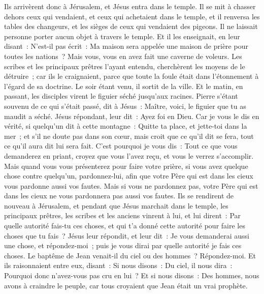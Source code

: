 \begin{multicols}{2}
Ils arrivèrent donc à Jérusalem, et Jésus entra dans le temple. Il se mit à chasser dehors ceux qui vendaient, et ceux qui achetaient dans le temple, et il renversa les tables des changeurs, et les sièges de ceux qui vendaient des pigeons.
Il ne laissait personne porter aucun objet à travers le temple.
Et il les enseignait, en leur disant~: N'est-il pas écrit~: Ma maison sera appelée une maison de prière pour toutes les nations~? Mais vous, vous en avez fait une caverne de voleurs.
Les scribes et les principaux prêtres l'ayant entendu, cherchèrent les moyens de le détruire~; car ils le craignaient, parce que toute la foule était dans l'étonnement à l’égard de sa doctrine.
Le soir étant venu, il sortit de la ville.
Et le matin, en passant, les disciples virent le figuier séché jusqu'aux racines.
Pierre s'étant souvenu de ce qui s'était passé, dit à Jésus~: Maître, voici, le figuier que tu as maudit a séché.
Jésus répondant, leur dit~: Ayez foi en Dieu.
Car je vous le dis en vérité, si quelqu'un dit à cette montagne~: Quitte ta place, et jette-toi dans la mer~; et s'il ne doute pas dans son cœur, mais croit que ce qu'il dit se fera, tout ce qu'il aura dit lui sera fait.
C'est pourquoi je vous dis~: Tout ce que vous demanderez en priant, croyez que vous l'avez reçu, et vous le verrez s'accomplir.
Mais quand vous vous présenterez pour faire votre prière, si vous avez quelque chose contre quelqu'un, pardonnez-lui, afin que votre Père qui est dans les cieux vous pardonne aussi vos fautes.
Mais si vous ne pardonnez pas, votre Père qui est dans les cieux ne vous pardonnera pas aussi vos fautes.
Ils se rendirent de nouveau à Jérusalem, et pendant que Jésus marchait dans le temple, les principaux prêtres, les scribes et les anciens vinrent à lui,
et lui dirent~: Par quelle autorité fais-tu ces choses, et qui t'a donné cette autorité pour faire les choses que tu fais~?
Jésus leur répondit, et leur dit~: Je vous demanderai aussi une chose, et répondez-moi~; puis je vous dirai par quelle autorité je fais ces choses.
Le baptême de Jean venait-il du ciel ou des hommes~? Répondez-moi.
Et ils raisonnaient entre eux, disant~: Si nous disons~: Du ciel, il nous dira~: Pourquoi donc n'avez-vous pas cru en lui~?
Et si nous disons~: Des hommes, nous avons à craindre le peuple, car tous croyaient que Jean était un vrai prophète.

\end{multicols}
